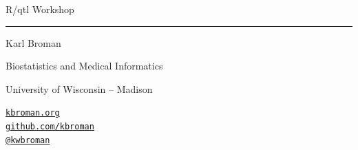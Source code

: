 \documentclass[12pt]{article}
\newcommand{\titlesize}{\fontsize{40}{50} \selectfont}
\newcommand{\textsize}{\fontsize{30}{35} \selectfont}
\newcommand{\smallsize}{\fontsize{25}{30} \selectfont}
\begin{document}
\thispagestyle{empty}

\begin{center}
\titlesize \color{myyellow}


\vspace*{15mm}

R/qtl Workshop

\color{mypink}
\rule{10in}{1mm}

\vspace{5mm}

\textsize \color{myblue}
Karl Broman
\vspace{5mm}

\color{mywhite}
{\smallsize Biostatistics and Medical Informatics

University of Wisconsin -- Madison
\vspace{20mm}


\href{http://kbroman.org}{\tt kbroman.org} \\[3pt]
\href{https://github.com/kbroman}{\tt github.com/kbroman} \\
\href{https://twitter.com/kwbroman}{\tt @kwbroman}
}

\end{center}

\newpage
\thispagestyle{empty}

\vspace*{-0.85in}
\end{document}
